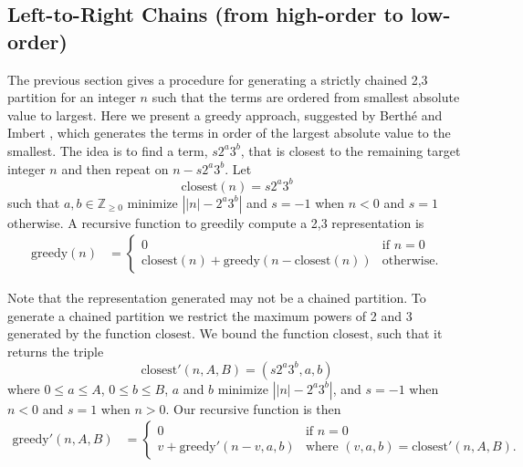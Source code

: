 \documentclass{ucalgthes1}
\theoremstyle{definition}
\newcommand{\ZZgez}{\mathbb{Z}_{\ge 0}}
\begin{document}
\bigbreak
\subsection{Left-to-Right Chains (from high-order to low-order)}
\label{subsec:ltorChains}

\newcommand{\greedyltor}{\textrm{greedy}}
\newcommand{\greedychain}{\textrm{greedy}'}
\newcommand{\greedybound}{\textrm{greedy}''}
\newcommand{\closest}{\textrm{closest}}
\newcommand{\amax}{A}
\newcommand{\bmax}{B}


The previous section gives a procedure for generating a strictly chained 2,3 partition for an integer $n$ such that the terms are ordered from smallest absolute value to largest.  Here we present a greedy approach, suggested by Berth{\'e} and Imbert \cite{Berthe2009}, which generates the terms in order of the largest absolute value to the smallest. The idea is to find a term, $s2^a3^b$, that is closest to the remaining target integer $n$ and then repeat on $n - s2^a3^b$. Let
\[
\closest(n) = s2^a3^b
\]
such that $a,b \in \ZZgez$ minimize $\left| |n| - 2^a3^b \right|$ and $s = -1$ when $n < 0$ and $s = 1$ otherwise. A recursive function to greedily compute a 2,3 representation is
\begin{align*}
\greedyltor(n) &= \begin{cases}
              0 & \textrm{if $n = 0$} \\
              \closest(n) + \greedyltor(n - \closest(n)) & \textrm{otherwise}.
          \end{cases}
\end{align*}

\noindent
Note that the representation generated may not be a chained partition. To generate a chained partition we restrict the maximum powers of 2 and 3 generated by the function $\closest$.  We bound the function $\closest$, such that it returns the triple
\[
\closest'(n, \amax, \bmax) = (s2^a3^b, a, b)
\]
where $0 \le a \le \amax$, $0 \le b \le \bmax$, $a$ and $b$ minimize $\left| |n| - 2^a3^b \right|$, and $s=-1$ when $n < 0$ and $s=1$ when $n > 0$. Our recursive function is then
\begin{align*}
\greedychain(n, \amax, \bmax) &= \begin{cases}
        0 & \textrm{if $n = 0$} \\
        v + \greedychain(n - v, a, b) & \textrm{where $(v, a, b) = \closest'(n, \amax, \bmax)$}.
    \end{cases}
\end{align*}
\end{document}
